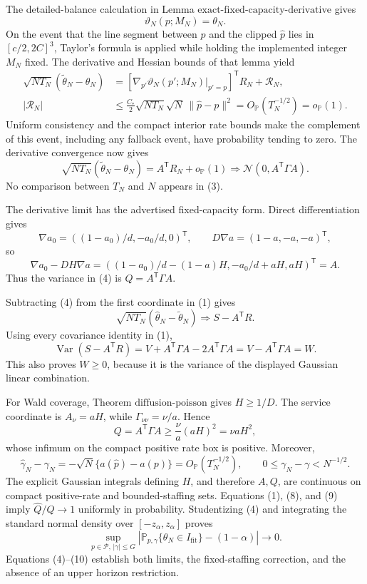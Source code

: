 The detailed-balance calculation in Lemma \(\mathrm{exact\mbox{-}fixed\mbox{-}capacity\mbox{-}derivative}\) gives
\[
 \vartheta_N(p;M_N)=\theta_N.                                 \tag{2}
\]
On the event that the line segment between \(p\) and the clipped \(\widehat p\) lies in \([c/2,2C]^3\), Taylor's formula is applied while holding the implemented integer \(M_N\) fixed.  The derivative and Hessian bounds of that lemma yield
\[
 \begin{split}
 \sqrt{NT_N}(\widetilde\theta_N-\theta_N)
 &=[\nabla_{p'}\vartheta_N(p';M_N)|_{p'=p}]^{\mathsf T}R_N+\mathcal R_N,\\
 |\mathcal R_N|
 &\leq\frac{C_*}{2}\sqrt{NT_N}\sqrt N\,\|\widehat p-p\|^2
 =O_{\mathbb P}(T_N^{-1/2})=o_{\mathbb P}(1).                 \tag{3}
 \end{split}
\]
Uniform consistency and the compact interior rate bounds make the complement of this event, including any fallback event, have probability tending to zero.  The derivative convergence now gives
\[
 \sqrt{NT_N}(\widetilde\theta_N-\theta_N)
 =A^{\mathsf T}R_N+o_{\mathbb P}(1)
 \Rightarrow\mathcal N(0,A^{\mathsf T}\Gamma A).             \tag{4}
\]
No comparison between \(T_N\) and \(N\) appears in (3).

The derivative limit has the advertised fixed-capacity form.  Direct differentiation gives
\[
 \nabla a_0=((1-a_0)/d,-a_0/d,0)^{\mathsf T},
 \qquad
 D\nabla a=(1-a,-a,-a)^{\mathsf T},
\]
so
\[
 \nabla a_0-DH\nabla a
 =((1-a_0)/d-(1-a)H,-a_0/d+aH,aH)^{\mathsf T}=A.              \tag{5}
\]
Thus the variance in (4) is \(Q=A^{\mathsf T}\Gamma A\).

Subtracting (4) from the first coordinate in (1) gives
\[
 \sqrt{NT_N}(\widehat\theta_N-\widetilde\theta_N)
 \Rightarrow S-A^{\mathsf T}R.                                \tag{6}
\]
Using every covariance identity in (1),
\[
 \operatorname{Var}(S-A^{\mathsf T}R)
 =V+A^{\mathsf T}\Gamma A-2A^{\mathsf T}\Gamma A
 =V-A^{\mathsf T}\Gamma A=W.                                 \tag{7}
\]
This also proves \(W\geq0\), because it is the variance of the displayed Gaussian linear combination.

For Wald coverage, Theorem \(\mathrm{diffusion\mbox{-}poisson}\) gives \(H\geq1/D\).  The service coordinate is \(A_\nu=aH\), while \(\Gamma_{\nu\nu}=\nu/a\).  Hence
\[
 Q=A^{\mathsf T}\Gamma A\geq\frac\nu a(aH)^2=\nu aH^2,     \tag{8}
\]
whose infimum on the compact positive rate box is positive.  Moreover,
\[
 \widehat\gamma_N-\gamma_N
 =-\sqrt N\{a(\widehat p)-a(p)\}=O_{\mathbb P}(T_N^{-1/2}),
 \qquad 0\leq\gamma_N-\gamma<N^{-1/2}.                       \tag{9}
\]
The explicit Gaussian integrals defining \(H\), and therefore \(A,Q\), are continuous on compact positive-rate and bounded-staffing sets.  Equations (1), (8), and (9) imply \(\widehat Q/Q\to1\) uniformly in probability.  Studentizing (4) and integrating the standard normal density over \([-z_\alpha,z_\alpha]\) proves
\[
 \sup_{p\in\mathcal P,\,|\gamma|\leq G}
 \left|\mathbb P_{p,\gamma}\{\theta_N\in I_{\mathrm{fit}}\}-(1-\alpha)\right|
 \longrightarrow0.                                           \tag{10}
\]
Equations (4)--(10) establish both limits, the fixed-staffing correction, and the absence of an upper horizon restriction.

